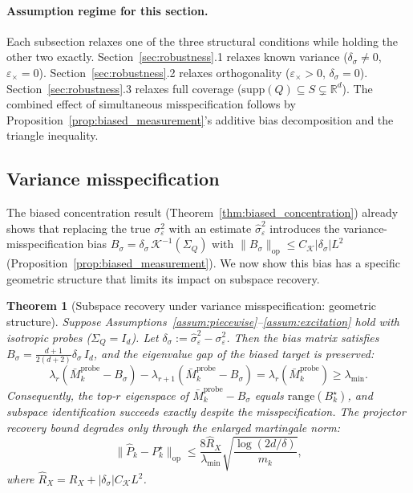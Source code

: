 \documentclass[12pt]{article}
\newcommand{\R}{\mathbb{R}}
\newcommand{\op}{\mathrm{op}}
\newcommand{\range}{\mathrm{range}}
\newcommand{\supp}{\mathrm{supp}}
\newtheorem{theorem}{Theorem}
\theoremstyle{plain}
\theoremstyle{definition}
\begin{document}
\paragraph{Assumption regime for this section.}
Each subsection relaxes one of the three structural conditions while holding the other two exactly. Section~\ref{sec:robustness}.1 relaxes known variance ($\delta_\sigma \neq 0$, $\varepsilon_\times = 0$). Section~\ref{sec:robustness}.2 relaxes orthogonality ($\varepsilon_\times > 0$, $\delta_\sigma = 0$). Section~\ref{sec:robustness}.3 relaxes full coverage ($\supp(Q) \subseteq S \subsetneq \R^d$). The combined effect of simultaneous misspecification follows by Proposition~\ref{prop:biased_measurement}'s additive bias decomposition and the triangle inequality.

\subsection{Variance misspecification}

The biased concentration result (Theorem~\ref{thm:biased_concentration}) already shows that replacing the true $\sigma_\varepsilon^2$ with an estimate $\hat\sigma_\varepsilon^2$ introduces the variance-misspecification bias $B_\sigma = \delta_\sigma\, \mathcal{K}^{-1}(\Sigma_Q)$ with $\|B_\sigma\|_{\op} \le C_{\mathcal{K}} |\delta_\sigma| L^2$ (Proposition~\ref{prop:biased_measurement}). We now show this bias has a specific geometric structure that limits its impact on subspace recovery.

\begin{theorem}[Subspace recovery under variance misspecification: geometric structure]
\label{thm:robustness_variance}
Suppose Assumptions~\ref{assum:piecewise}--\ref{assum:excitation} hold with isotropic probes ($\Sigma_Q = I_d$). Let $\delta_\sigma := \hat\sigma_\varepsilon^2 - \sigma_\varepsilon^2$. Then the bias matrix satisfies $B_\sigma = \frac{d+1}{2(d+2)} \delta_\sigma\, I_d$, and the eigenvalue gap of the biased target is preserved:
\[
\lambda_r(\bar{M}_k^{\mathrm{probe}} - B_\sigma) - \lambda_{r+1}(\bar{M}_k^{\mathrm{probe}} - B_\sigma)
= \lambda_r(\bar{M}_k^{\mathrm{probe}}) \ge \lambda_{\min}.
\]
Consequently, the top-$r$ eigenspace of $\bar{M}_k^{\mathrm{probe}} - B_\sigma$ equals $\range(B_k^\star)$, and subspace identification succeeds \emph{exactly} despite the misspecification. The projector recovery bound degrades only through the enlarged martingale norm:
\[
\|\widehat{P}_k - P_k^\star\|_{\op} \le \frac{8\hat{R}_X}{\lambda_{\min}} \sqrt{\frac{\log(2d/\delta)}{m_k}},
\]
where $\hat{R}_X = R_X + |\delta_\sigma| C_{\mathcal{K}} L^2$.
\end{theorem}
\end{document}
